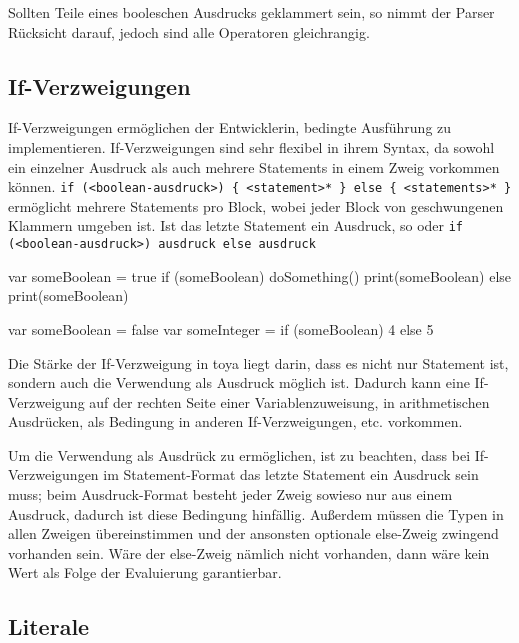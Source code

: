 Sollten Teile eines booleschen Ausdrucks geklammert sein, so nimmt der Parser Rücksicht darauf, jedoch sind alle Operatoren gleichrangig.


\subsection{If-Verzweigungen}

If-Verzweigungen ermöglichen der Entwicklerin, bedingte Ausführung zu implementieren. If-Verzweigungen sind sehr flexibel in ihrem Syntax, da sowohl ein einzelner Ausdruck als auch mehrere Statements in einem Zweig vorkommen können. \texttt{if (<boolean-ausdruck>) \{ <statement>* \} else \{ <statements>* \}} ermöglicht mehrere Statements pro Block, wobei jeder Block von geschwungenen Klammern umgeben ist. Ist das letzte Statement ein Ausdruck, so  oder \texttt{if (<boolean-ausdruck>) ausdruck else ausdruck}

\begin{ToyaCode}[numbers=none, caption={If-Verzweigung als klassisches Statement.}]
var someBoolean = true
if (someBoolean) {
    doSomething()
    print(someBoolean)
} else {
    print(someBoolean)
}
\end{ToyaCode}

\begin{ToyaCode}[numbers=none, caption={If-Verzweigung als Ausdruck in einer Variablenzuweisung.}]
var someBoolean = false
var someInteger = if (someBoolean) 4 else 5
\end{ToyaCode}

Die Stärke der If-Verzweigung in toya liegt darin, dass es nicht nur Statement ist, sondern auch die Verwendung als Ausdruck möglich ist. Dadurch kann eine If-Verzweigung auf der rechten Seite einer Variablenzuweisung, in arithmetischen Ausdrücken, als Bedingung in anderen If-Verzweigungen, etc. vorkommen.

Um die Verwendung als Ausdrück zu ermöglichen, ist zu beachten, dass bei If-Verzweigungen im Statement-Format das letzte Statement ein Ausdruck sein muss; beim Ausdruck-Format besteht jeder Zweig sowieso nur aus einem Ausdruck, dadurch ist diese Bedingung hinfällig. Außerdem müssen die Typen in allen Zweigen übereinstimmen und der ansonsten optionale else-Zweig zwingend vorhanden sein. Wäre der else-Zweig nämlich nicht vorhanden, dann wäre kein Wert als Folge der Evaluierung garantierbar.

\subsection{Literale}

